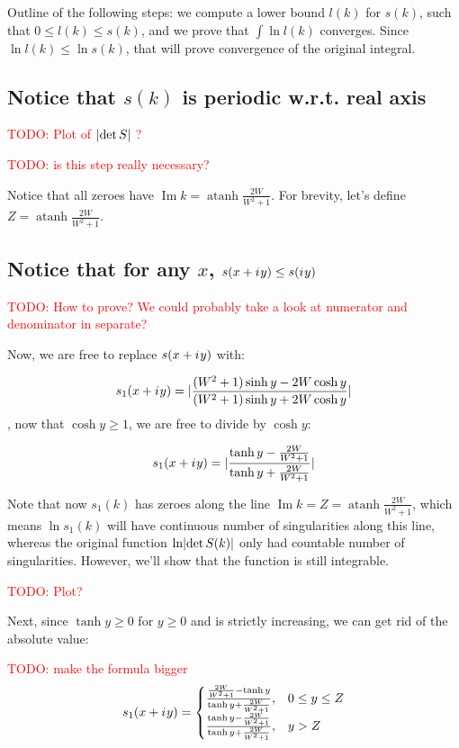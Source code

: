 \documentclass[12pt, a4paper]{article}
\DeclarePairedDelimiter{\abs}{\lvert}{\rvert}
\newcommand{\iu}{{i\mkern1mu}}
\renewcommand{\Im}{\operatorname{Im}}
\newcommand{\todo}[1]{{\large \textcolor{red}{TODO: #1}}}
\DeclareMathOperator\atanh{atanh}
\begin{document}
Outline of the following steps: we compute a lower bound $l(k)$ for $s(k)$, such that $0 \le l(k) \le s(k)$, and we prove that $\int \ln l(k)$ converges. Since $\ln l(k) \le \ln s(k)$, that will prove convergence of the original integral.

\subsection{Notice that $s(k)$ is periodic w.r.t. real axis}
\todo{Plot of $\abs{\det S}$ ?}

\todo{is this step really necessary?}

Notice that all zeroes have $\Im k = \atanh \frac{2 W}{W^2 + 1}$. For brevity, let's define $Z = \atanh \frac{2 W}{W^2 + 1}$.

\subsection{Notice that for any $x$, $s(x + \iu y) \le s(\iu y)$}
\todo{How to prove? We could probably take a look at numerator and denominator in separate?}

Now, we are free to replace $s(x + \iu y)$ with:

\[
s_1(x + \iu y)
 = \abs{\frac{(W^2 + 1) \sinh y - 2 W \cosh y}{(W^2 + 1) \sinh y + 2 W \cosh y}}
\]
, now that $\cosh y \ge 1$, we are free to divide by $\cosh y$:

\[
s_1(x + \iu y)
 = \abs{\frac{\tanh y - \frac{2 W}{W^2 + 1}}{\tanh y + \frac{2 W}{W^2 + 1}}}
\]

Note that now $s_1(k)$ has zeroes along the line $\Im k = Z = \atanh \frac{2 W}{W^2 + 1}$, which means $\ln s_1(k)$ will have continuous number of singularities along this line, whereas the original function $\ln\abs{\det S(k)}$ only had countable number of singularities. However, we'll show that the function is still integrable.

\todo{Plot?}

Next, since $\tanh y \ge 0$ for $y \ge 0$ and is strictly increasing, we can get rid of the absolute value:

\todo{make the formula bigger}
\[
s_1(x + \iu y)
 = \begin{cases}
 \frac{\frac{2 W}{W^2 + 1} - \tanh y}{\tanh y + \frac{2 W}{W^2 + 1}}, & 0 \le y \le Z \\
 \frac{\tanh y - \frac{2 W}{W^2 + 1}}{\tanh y + \frac{2 W}{W^2 + 1}}, & y > Z 
 \end{cases}
\]
\end{document}
